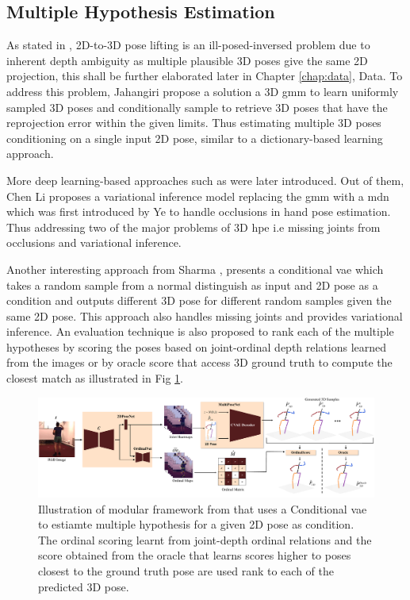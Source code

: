 \subsection{Multiple Hypothesis Estimation}
\label{subsec:multiple_hypothesis_estimation}

As stated in , 2D-to-3D pose lifting is an ill-posed-inversed problem due to inherent depth ambiguity as multiple plausible 3D poses give the same 2D projection, this shall be further elaborated later in Chapter \ref{chap:data}, Data. To address this problem, Jahangiri \etal \cite{jahangiri} propose a solution a 3D \ac{gmm} to learn uniformly sampled 3D poses and conditionally sample to retrieve 3D poses that have the reprojection error within the given limits. Thus estimating multiple 3D poses conditioning on a single input 2D pose, similar to a dictionary-based learning approach. 

More deep learning-based approaches such as \cite{weaklymultiple,multiplehypo,ordinalranking} were later introduced. Out of them, Chen Li \etal \cite{multiplehypo} proposes a variational inference model replacing the \ac{gmm} with a \ac{mdn} which was first introduced by Ye \etal \cite{mixturedensitymodel} to handle occlusions in hand pose estimation. Thus addressing two of the major problems of 3D \ac{hpe} i.e missing joints from occlusions and variational inference. 

Another interesting approach from Sharma \etal \cite{ordinalranking}, presents a conditional \acl{vae} which takes a random sample from a normal distinguish as input and 2D pose as a condition and outputs different 3D pose for different random samples given the same 2D pose. This approach also handles missing joints and provides variational inference. An evaluation technique is also proposed to rank each of the multiple hypotheses by scoring the poses based on joint-ordinal depth relations learned from the images or by oracle score that access 3D ground truth to compute the closest match as illustrated in Fig \ref{fig:ordinal_arch}.

\begin{figure}[h]
    \centering
    \includegraphics[width=\linewidth]{figures/background/ordinal_arch.pdf}
    \caption{Illustration of modular framework from \cite{ordinalranking} that uses a Conditional \ac{vae} to estiamte multiple hypothesis for a given 2D pose as condition. The ordinal scoring learnt from joint-depth ordinal relations and the score obtained from the oracle that learns scores higher to poses closest to the ground truth pose are used rank to each of the predicted 3D pose.}
    \label{fig:ordinal_arch}
\end{figure}

